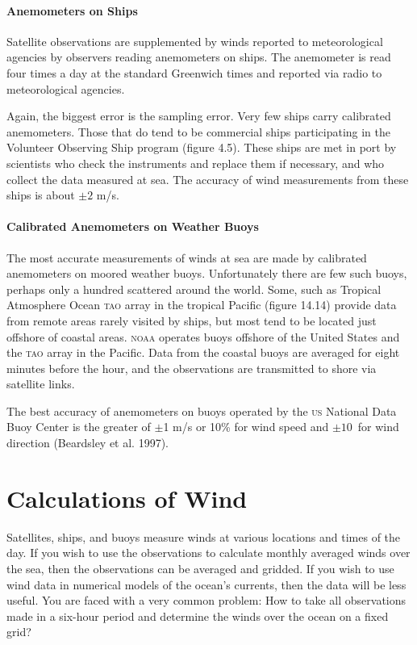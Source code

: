 \paragraph{Anemometers on Ships}
Satellite observations are supplemented by winds reported to meteorological agencies by
observers reading ane\-mom\-eters on ships. The anemometer is read four times a day at the standard
Greenwich times and reported via radio to meteorological agencies. 

Again, the biggest error is the sampling error. Very few ships carry
calibrated anemometers. Those that do tend to be commercial ships participating in the
Volunteer Observing Ship program (figure 4.5). These ships are met in port by scientists who
check the instruments and replace them if necessary, and who collect the data measured at sea.
The accuracy of wind measurements from these ships is about $\pm 2$
m/s.

\paragraph{Calibrated Anemometers on Weather Buoys}
The most accurate measurements of winds at sea are made by calibrated anemometers
on moored weather buoys. Unfortunately there are few such buoys, perhaps only a
hundred scattered around the world. Some, such as Tropical Atmosphere Ocean
\textsc{tao} array in the tropical Pacific (figure 14.14) provide data from remote
areas rarely visited by ships, but most tend to be located just offshore of coastal
areas.
\textsc{noaa} operates buoys offshore of the United States and the \textsc{tao}
array in the Pacific. Data from the coastal buoys are averaged for eight minutes
before the hour, and the observations are transmitted to shore via satellite
links.

The best accuracy of anemometers on buoys operated by the \textsc{us} National Data
Buoy Center is the greater of \(\pm\)1 m/s or 10\% for wind speed and $\pm
10$\degrees\ for wind direction (Beardsley et al. 1997).

\section{Calculations of Wind}
Satellites, ships, and buoys measure winds
at various locations and times of the day. If you wish to use the observations to
calculate monthly averaged winds over the sea, then the observations can be
averaged and gridded. If you wish to use wind data in numerical models of the
ocean's currents, then the data will be less useful. You are faced with a very
common problem: How to take all observations made in a six-hour period and determine
the winds over the ocean on a fixed grid?

